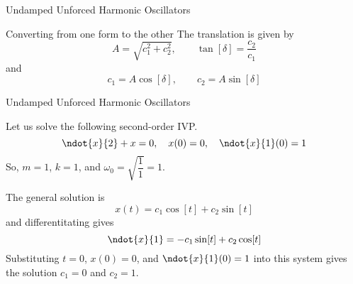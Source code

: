 \documentclass{beamer}
\begin{document}
\begin{frame}{Undamped Unforced Harmonic Oscillators}
\begin{block}{Converting from one form to the other}
The translation is given by
\begin{equation*}
A=\sqrt{c_1^2+c_2^2},\qquad\tan[\delta]=\dfrac{c_2}{c_1}
\end{equation*}
and
\begin{equation*}
c_1=A\cos[\delta],\qquad c_2=A\sin[\delta]
\end{equation*}
\end{block}
\end{frame}

\begin{frame}{Undamped Unforced Harmonic Oscillators}
\begin{example}
Let us solve the following second-order IVP\@.
\begin{equation*}
\ndot{x}{2}+x=0,\quad
x(0)=0,\quad
\ndot{x}{1}(0)=1
\end{equation*}\pause
So, $m=1$, $k=1$, and $\omega_0=\sqrt{\dfrac{1}{1}}=1$.\pause

The general solution is
\begin{equation*}
x(t)=c_1\cos[t]+c_2\sin[t]
\end{equation*}
and differentitating gives
\begin{equation*}
\ndot{x}{1}=-c_1\sin[t]+c_2\cos[t]
\end{equation*}\pause
Substituting $t=0$, $x(0)=0$, and $\ndot{x}{1}(0)=1$ into this system gives the solution $c_1=0$ and $c_2=1$.
\end{example}
\end{frame}
\end{document}
